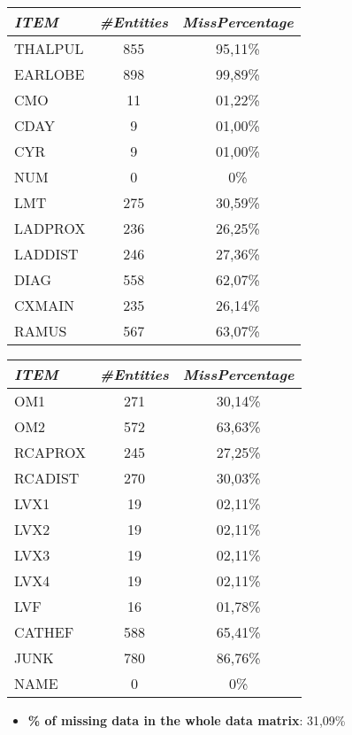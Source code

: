 \documentclass[a4paper,12pt]{article}
\begin{document}
        \begin{multicols}{2}
            
            \begin{tabular}{|l|c|c|} \hline

                \textit{ITEM} 	& \textit{\#Entities}	& \textit{MissPercentage} \\
                \hline THALPUL	&	855		&	95,11\% \\
                \hline EARLOBE	&	898		&	99,89\% \\
                \hline CMO		&	11	&	01,22\% \\
                \hline CDAY		&	9	&	01,00\% \\
                \hline CYR		&	9	&	01,00\% \\
                \hline NUM		&	0	&	0\% \\
                \hline LMT		&	275	&	30,59\% \\
                \hline LADPROX	&	236	&	26,25\% \\
                \hline LADDIST	&	246	&	27,36\% \\
                \hline DIAG		&	558	&	62,07\% \\
                \hline CXMAIN	&	235	&	26,14\% \\
                \hline RAMUS	&	567	&	63,07\% \\ \hline
                
            \end{tabular}
            
            \begin{tabular}{|l|c|c|} \hline

                \textit{ITEM} 	& \textit{\#Entities}	& \textit{MissPercentage} \\
                \hline OM1		&	271	&	30,14\% \\
                \hline OM2		&	572	&	63,63\% \\
                \hline RCAPROX	&	245	&	27,25\% \\
                \hline RCADIST	&	270	&	30,03\% \\
                \hline LVX1		&	19	&	02,11\% \\
                \hline LVX2		&	19	&	02,11\% \\
                \hline LVX3		&	19	&	02,11\% \\
                \hline LVX4		&	19	&	02,11\% \\
                \hline LVF		&	16	&	01,78\% \\
                \hline CATHEF	&	588	&	65,41\% \\
                \hline JUNK		&	780	&	86,76\% \\
                \hline NAME		&	0	&	0\% \\ \hline
                
            \end{tabular}
	\end{multicols}
    
    \begin{itemize}
        \item \textbf{\% of missing data in the whole data matrix}: 31,09\%

    \end{itemize}
    
\end{document}
